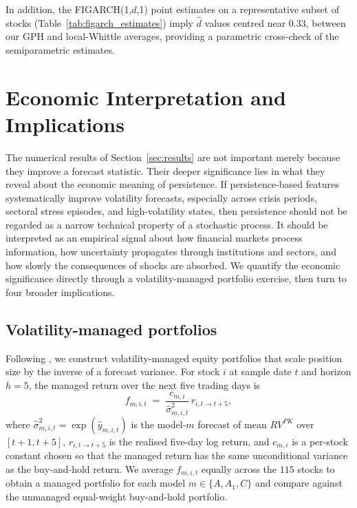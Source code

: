 \documentclass[11pt,a4paper]{article}
\newcommand{\dhat}{\hat d}
\begin{document}


In addition, the FIGARCH(1,$d$,1) point estimates on a
representative subset of stocks (Table~\ref{tab:figarch_estimates})
imply $\dhat$ values centred near $0.33$, between our GPH and
local-Whittle averages, providing a parametric cross-check of the
semiparametric estimates.

\section{Economic Interpretation and Implications}
\label{sec:economic}

The numerical results of Section~\ref{sec:results} are not important
merely because they improve a forecast statistic. Their deeper
significance lies in what they reveal about the economic meaning of
persistence. If persistence-based features systematically improve
volatility forecasts, especially across crisis periods, sectoral stress
episodes, and high-volatility states, then persistence should not be
regarded as a narrow technical property of a stochastic process. It
should be interpreted as an empirical signal about how financial markets
process information, how uncertainty propagates through institutions and
sectors, and how slowly the consequences of shocks are absorbed. We
quantify the economic significance directly through a
volatility-managed portfolio exercise, then turn to four broader
implications.

\subsection{Volatility-managed portfolios}
\label{subsec:volmanaged}

Following \citet{moreira2017volatility}, we construct
volatility-managed equity portfolios that scale position size by the
inverse of a forecast variance. For stock $i$ at sample date $t$ and
horizon $h=5$, the managed return over the next five trading days is
\begin{equation}
  f_{m,i,t} \;=\; \frac{c_{m,i}}{\hat\sigma^2_{m,i,t}}\,r_{i,t\to t+5},
\end{equation}
where $\hat\sigma^2_{m,i,t} = \exp(\hat y_{m,i,t})$ is the model-$m$
forecast of mean $RV^{PK}$ over $[t+1,t+5]$, $r_{i,t\to t+5}$ is the
realised five-day log return, and $c_{m,i}$ is a per-stock constant
chosen so that the managed return has the same unconditional variance
as the buy-and-hold return. We average $f_{m,i,t}$ equally across the
$115$ stocks to obtain a managed portfolio for each model
$m\in\{A,A_1,C\}$ and compare against the unmanaged equal-weight
buy-and-hold portfolio.
\end{document}
